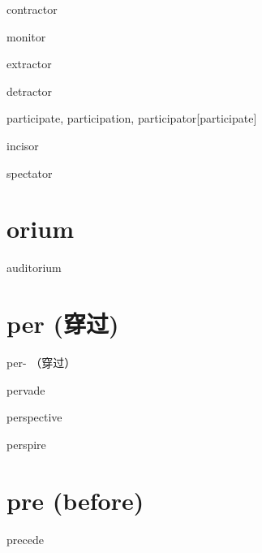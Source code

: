 \begin{wordRef}{contractor}
\end{wordRef}

\begin{wordRef}{monitor}
\end{wordRef}

\begin{wordRef}{extractor}
\end{wordRef}

\begin{wordRef}{detractor}
\end{wordRef}

\begin{wordRef}{participate, participation, participator}[participate]
\end{wordRef}

\begin{wordRef}{incisor}
\end{wordRef}

\begin{wordRef}{spectator}
\end{wordRef}

\section{orium}

\begin{wordRef}{auditorium}
\end{wordRef}

\section{per (穿过)}
{per- （穿过）}

\begin{wordRef}{pervade}
\end{wordRef}

\begin{wordRef}{perspective}
\end{wordRef}

\begin{wordRef}{perspire}
\end{wordRef}

\section{pre (before)}
\begin{wordRef}{precede}
\end{wordRef}

